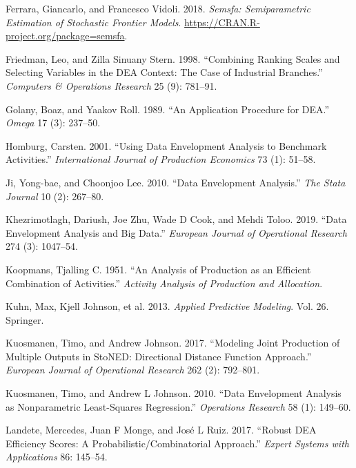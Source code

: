 \begin{CSLReferences}{1}{0}
\leavevmode{}%
Ferrara, Giancarlo, and Francesco Vidoli. 2018. \emph{Semsfa: Semiparametric Estimation of Stochastic Frontier Models}. \url{https://CRAN.R-project.org/package=semsfa}.

\leavevmode{}%
Friedman, Leo, and Zilla Sinuany Stern. 1998. {``Combining Ranking Scales and Selecting Variables in the DEA Context: The Case of Industrial Branches.''} \emph{Computers \& Operations Research} 25 (9): 781--91.

\leavevmode{}%
Golany, Boaz, and Yaakov Roll. 1989. {``An Application Procedure for DEA.''} \emph{Omega} 17 (3): 237--50.

\leavevmode{}%
Homburg, Carsten. 2001. {``Using Data Envelopment Analysis to Benchmark Activities.''} \emph{International Journal of Production Economics} 73 (1): 51--58.

\leavevmode{}%
Ji, Yong-bae, and Choonjoo Lee. 2010. {``Data Envelopment Analysis.''} \emph{The Stata Journal} 10 (2): 267--80.

\leavevmode{}%
Khezrimotlagh, Dariush, Joe Zhu, Wade D Cook, and Mehdi Toloo. 2019. {``Data Envelopment Analysis and Big Data.''} \emph{European Journal of Operational Research} 274 (3): 1047--54.

\leavevmode{}%
Koopmans, Tjalling C. 1951. {``An Analysis of Production as an Efficient Combination of Activities.''} \emph{Activity Analysis of Production and Allocation}.

\leavevmode{}%
Kuhn, Max, Kjell Johnson, et al. 2013. \emph{Applied Predictive Modeling}. Vol. 26. Springer.

\leavevmode{}%
Kuosmanen, Timo, and Andrew Johnson. 2017. {``Modeling Joint Production of Multiple Outputs in StoNED: Directional Distance Function Approach.''} \emph{European Journal of Operational Research} 262 (2): 792--801.

\leavevmode{}%
Kuosmanen, Timo, and Andrew L Johnson. 2010. {``Data Envelopment Analysis as Nonparametric Least-Squares Regression.''} \emph{Operations Research} 58 (1): 149--60.

\leavevmode{}%
Landete, Mercedes, Juan F Monge, and José L Ruiz. 2017. {``Robust DEA Efficiency Scores: A Probabilistic/Combinatorial Approach.''} \emph{Expert Systems with Applications} 86: 145--54.


\end{CSLReferences}
